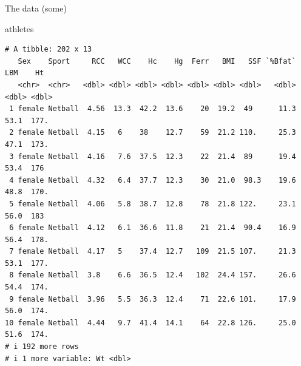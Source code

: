 \documentclass[
  ignorenonframetext,
]{beamer}
\newenvironment{Shaded}{\begin{snugshade}}{\end{snugshade}}
\newcommand{\NormalTok}[1]{\textcolor[rgb]{0.00,0.23,0.31}{#1}}
\begin{document}
\begin{frame}[fragile]{The data (some)}
\label{the-data-some}
\begin{Shaded}
\begin{Highlighting}[]
\NormalTok{athletes}
\end{Highlighting}
\end{Shaded}

\begin{verbatim}
# A tibble: 202 x 13
   Sex    Sport     RCC   WCC    Hc    Hg  Ferr   BMI   SSF `%Bfat`   LBM    Ht
   <chr>  <chr>   <dbl> <dbl> <dbl> <dbl> <dbl> <dbl> <dbl>   <dbl> <dbl> <dbl>
 1 female Netball  4.56  13.3  42.2  13.6    20  19.2  49      11.3  53.1  177.
 2 female Netball  4.15   6    38    12.7    59  21.2 110.     25.3  47.1  173.
 3 female Netball  4.16   7.6  37.5  12.3    22  21.4  89      19.4  53.4  176 
 4 female Netball  4.32   6.4  37.7  12.3    30  21.0  98.3    19.6  48.8  170.
 5 female Netball  4.06   5.8  38.7  12.8    78  21.8 122.     23.1  56.0  183 
 6 female Netball  4.12   6.1  36.6  11.8    21  21.4  90.4    16.9  56.4  178.
 7 female Netball  4.17   5    37.4  12.7   109  21.5 107.     21.3  53.1  177.
 8 female Netball  3.8    6.6  36.5  12.4   102  24.4 157.     26.6  54.4  174.
 9 female Netball  3.96   5.5  36.3  12.4    71  22.6 101.     17.9  56.0  174.
10 female Netball  4.44   9.7  41.4  14.1    64  22.8 126.     25.0  51.6  174.
# i 192 more rows
# i 1 more variable: Wt <dbl>
\end{verbatim}
\end{frame}
\end{document}
